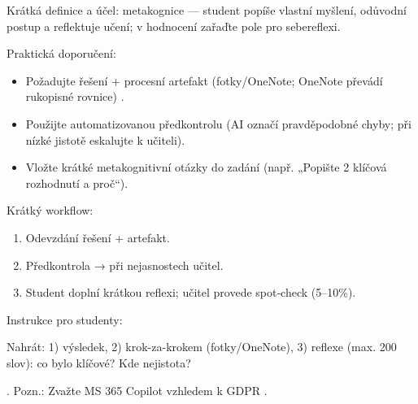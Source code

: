 Krátká definice a účel: metakognice — student popíše vlastní myšlení, odůvodní postup a reflektuje učení; v hodnocení zařaďte pole pro sebereflexi.

Praktická doporučení:
\begin{itemize}
  \item Požadujte řešení + procesní artefakt (fotky/OneNote; OneNote převádí rukopisné rovnice) \cite{kb_ai_101_tipu_pdf_04e4a115_page_8_1}.
  \item Použijte automatizovanou předkontrolu (AI označí pravděpodobné chyby; při nízké jistotě eskalujte k učiteli).
  \item Vložte krátké metakognitivní otázky do zadání (např. „Popište 2 klíčová rozhodnutí a proč“).
\end{itemize}

Krátký workflow:
\begin{enumerate}
  \item Odevzdání řešení + artefakt.
  \item Předkontrola → při nejasnostech učitel.
  \item Student doplní krátkou reflexi; učitel provede spot‑check (5–10\%).
\end{enumerate}

Instrukce pro studenty: 
\begin{PromptBlock}

Nahrát: 1) výsledek, 2) krok-za-krokem (fotky/OneNote), 3) reflexe (max. 200 slov): co bylo klíčové? Kde nejistota?
\end{PromptBlock}
. Pozn.: Zvažte MS 365 Copilot vzhledem k GDPR \cite{kb_ai_101_tipu_pdf_04e4a115_page_3_1}.